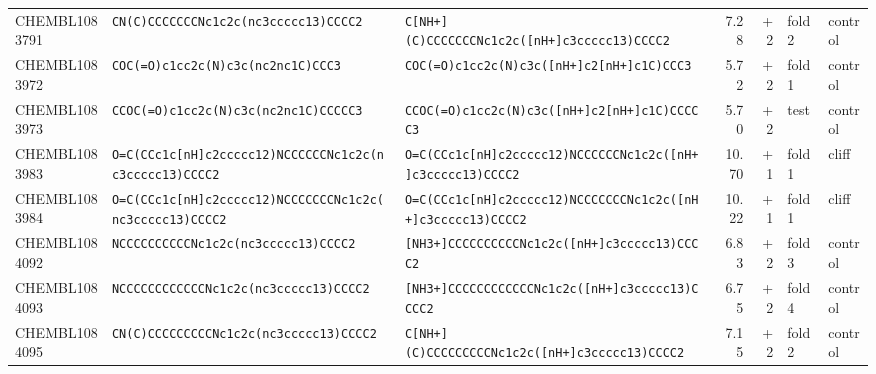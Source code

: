 \begin{longtable}{l p{4.4cm} p{4.4cm} r r l l}
CHEMBL1083791 & \texttt{CN(\allowbreak{}C)\allowbreak{}CCCCCCCNc1c2c(\allowbreak{}nc3ccccc13)\allowbreak{}CCCC2} & \texttt{C[NH+]\allowbreak{}(\allowbreak{}C)\allowbreak{}CCCCCCCNc1c2c(\allowbreak{}[nH+]\allowbreak{}c3ccccc13)\allowbreak{}CCCC2} & 7.28 & +2 & fold 2 & control \\
CHEMBL1083972 & \texttt{COC(\allowbreak{}=\allowbreak{}O)\allowbreak{}c1cc2c(\allowbreak{}N)\allowbreak{}c3c(\allowbreak{}nc2nc1C)\allowbreak{}CCC3} & \texttt{COC(\allowbreak{}=\allowbreak{}O)\allowbreak{}c1cc2c(\allowbreak{}N)\allowbreak{}c3c(\allowbreak{}[nH+]\allowbreak{}c2[nH+]\allowbreak{}c1C)\allowbreak{}CCC3} & 5.72 & +2 & fold 1 & control \\
CHEMBL1083973 & \texttt{CCOC(\allowbreak{}=\allowbreak{}O)\allowbreak{}c1cc2c(\allowbreak{}N)\allowbreak{}c3c(\allowbreak{}nc2nc1C)\allowbreak{}CCCCC3} & \texttt{CCOC(\allowbreak{}=\allowbreak{}O)\allowbreak{}c1cc2c(\allowbreak{}N)\allowbreak{}c3c(\allowbreak{}[nH+]\allowbreak{}c2[nH+]\allowbreak{}c1C)\allowbreak{}CCCCC3} & 5.70 & +2 & test & control \\
CHEMBL1083983 & \texttt{O=\allowbreak{}C(\allowbreak{}CCc1c[nH]\allowbreak{}c2ccccc12)\allowbreak{}NCCCCCCNc1c2c(\allowbreak{}nc3ccccc13)\allowbreak{}CCCC2} & \texttt{O=\allowbreak{}C(\allowbreak{}CCc1c[nH]\allowbreak{}c2ccccc12)\allowbreak{}NCCCCCCNc1c2c(\allowbreak{}[nH+]\allowbreak{}c3ccccc13)\allowbreak{}CCCC2} & 10.70 & +1 & fold 1 & cliff \\
CHEMBL1083984 & \texttt{O=\allowbreak{}C(\allowbreak{}CCc1c[nH]\allowbreak{}c2ccccc12)\allowbreak{}NCCCCCCCNc1c2c(\allowbreak{}nc3ccccc13)\allowbreak{}CCCC2} & \texttt{O=\allowbreak{}C(\allowbreak{}CCc1c[nH]\allowbreak{}c2ccccc12)\allowbreak{}NCCCCCCCNc1c2c(\allowbreak{}[nH+]\allowbreak{}c3ccccc13)\allowbreak{}CCCC2} & 10.22 & +1 & fold 1 & cliff \\
CHEMBL1084092 & \texttt{NCCCCCCCCCCNc1c2c(\allowbreak{}nc3ccccc13)\allowbreak{}CCCC2} & \texttt{[NH3+]\allowbreak{}CCCCCCCCCCNc1c2c(\allowbreak{}[nH+]\allowbreak{}c3ccccc13)\allowbreak{}CCCC2} & 6.83 & +2 & fold 3 & control \\
CHEMBL1084093 & \texttt{NCCCCCCCCCCCCNc1c2c(\allowbreak{}nc3ccccc13)\allowbreak{}CCCC2} & \texttt{[NH3+]\allowbreak{}CCCCCCCCCCCCNc1c2c(\allowbreak{}[nH+]\allowbreak{}c3ccccc13)\allowbreak{}CCCC2} & 6.75 & +2 & fold 4 & control \\
CHEMBL1084095 & \texttt{CN(\allowbreak{}C)\allowbreak{}CCCCCCCCCNc1c2c(\allowbreak{}nc3ccccc13)\allowbreak{}CCCC2} & \texttt{C[NH+]\allowbreak{}(\allowbreak{}C)\allowbreak{}CCCCCCCCCNc1c2c(\allowbreak{}[nH+]\allowbreak{}c3ccccc13)\allowbreak{}CCCC2} & 7.15 & +2 & fold 2 & control \\

\end{longtable}
